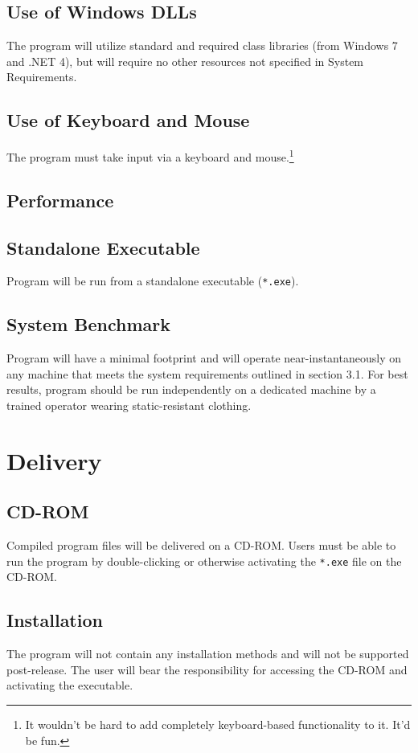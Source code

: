 \documentclass[12pt]{article}
\begin{document}
\subsection{Use of Windows DLLs}
The program will utilize standard and required class libraries (from Windows 7
and .NET 4), but will require no other resources not specified in System
Requirements.
\subsection{Use of Keyboard and Mouse}
The program must take input via a keyboard and mouse.\footnote{It wouldn't be
hard to add completely keyboard-based functionality to it. It'd be fun.}

\subsection{Performance}
\subsection{Standalone Executable}
Program will be run from a standalone executable (\texttt{*.exe}).
\subsection{System Benchmark}
Program will have a minimal footprint and will operate near-instantaneously on
any machine that meets the system requirements outlined in section 3.1. For
best results, program should be run independently on a dedicated machine by a
trained operator wearing static-resistant clothing.

\section{Delivery}
\subsection{CD-ROM}
Compiled program files will be delivered on a CD-ROM. Users must be able to run
the program by double-clicking or otherwise activating the \texttt{*.exe} file
on the CD-ROM.

\subsection{Installation}
The program will not contain any installation methods and will not be supported
post-release.  The user will bear the responsibility for accessing the CD-ROM
and activating the executable.
\end{document}
